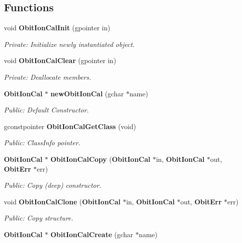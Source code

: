 \subsection*{Functions}
\begin{CompactItemize}
\item 
void {\bf Obit\-Ion\-Cal\-Init} (gpointer in)
\begin{CompactList}\small\item\em Private: Initialize newly instantiated object. \item\end{CompactList}\item 
void {\bf Obit\-Ion\-Cal\-Clear} (gpointer in)
\begin{CompactList}\small\item\em Private: Deallocate members. \item\end{CompactList}\item 
{\bf Obit\-Ion\-Cal} $\ast$ {\bf new\-Obit\-Ion\-Cal} (gchar $\ast$name)
\begin{CompactList}\small\item\em Public: Default Constructor. \item\end{CompactList}\item 
gconstpointer {\bf Obit\-Ion\-Cal\-Get\-Class} (void)
\begin{CompactList}\small\item\em Public: Class\-Info pointer. \item\end{CompactList}\item 
{\bf Obit\-Ion\-Cal} $\ast$ {\bf Obit\-Ion\-Cal\-Copy} ({\bf Obit\-Ion\-Cal} $\ast$in, {\bf Obit\-Ion\-Cal} $\ast$out, {\bf Obit\-Err} $\ast$err)
\begin{CompactList}\small\item\em Public: Copy (deep) constructor. \item\end{CompactList}\item 
void {\bf Obit\-Ion\-Cal\-Clone} ({\bf Obit\-Ion\-Cal} $\ast$in, {\bf Obit\-Ion\-Cal} $\ast$out, {\bf Obit\-Err} $\ast$err)
\begin{CompactList}\small\item\em Public: Copy structure. \item\end{CompactList}\item 
{\bf Obit\-Ion\-Cal} $\ast$ {\bf Obit\-Ion\-Cal\-Create} (gchar $\ast$name)

\end{CompactItemize}
